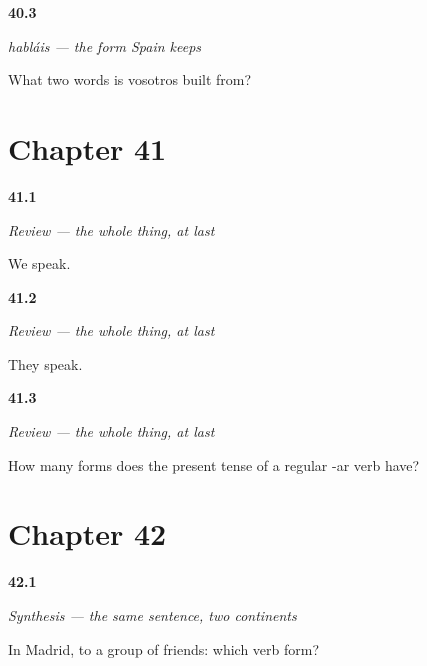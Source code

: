 \noindent\begin{minipage}[t]{\linewidth}
\raggedright
\hypertarget{review-ES-C07-hablais-why}{\textbf{40.3}} \emph{habláis — the form Spain keeps}\par
\small What two words is vosotros built from?
\end{minipage}\par\medskip

\section*{Chapter 41}

\noindent\begin{minipage}[t]{\linewidth}
\raggedright
\hypertarget{review-ES-C07-repaso-presente-completo-we}{\textbf{41.1}} \emph{Review — the whole thing, at last}\par
\small We speak.
\end{minipage}\par\medskip

\noindent\begin{minipage}[t]{\linewidth}
\raggedright
\hypertarget{review-ES-C07-repaso-presente-completo-they}{\textbf{41.2}} \emph{Review — the whole thing, at last}\par
\small They speak.
\end{minipage}\par\medskip

\noindent\begin{minipage}[t]{\linewidth}
\raggedright
\hypertarget{review-ES-C07-repaso-presente-completo-count}{\textbf{41.3}} \emph{Review — the whole thing, at last}\par
\small How many forms does the present tense of a regular -ar verb have?
\end{minipage}\par\medskip

\section*{Chapter 42}

\noindent\begin{minipage}[t]{\linewidth}
\raggedright
\hypertarget{review-ES-C07-sintesis-dos-continentes-madrid}{\textbf{42.1}} \emph{Synthesis — the same sentence, two continents}\par
\small In Madrid, to a group of friends: which verb form?
\end{minipage}\par\medskip

